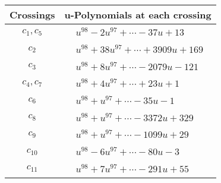 \documentclass[1p]{elsarticle_modified}
\theoremstyle{definition}
\begin{document}
\begin{tabular}{m{50pt}|m{274pt}}
Crossings & \hspace{64pt}u-Polynomials at each crossing \\
\hline $$\begin{aligned}c_{1},c_{5}\end{aligned}$$&$\begin{aligned}
&u^{98}-2 u^{97}+\cdots-37 u+13
\end{aligned}$\\
\hline $$\begin{aligned}c_{2}\end{aligned}$$&$\begin{aligned}
&u^{98}+38 u^{97}+\cdots+3909 u+169
\end{aligned}$\\
\hline $$\begin{aligned}c_{3}\end{aligned}$$&$\begin{aligned}
&u^{98}+8 u^{97}+\cdots-2079 u-121
\end{aligned}$\\
\hline $$\begin{aligned}c_{4},c_{7}\end{aligned}$$&$\begin{aligned}
&u^{98}+4 u^{97}+\cdots+23 u+1
\end{aligned}$\\
\hline $$\begin{aligned}c_{6}\end{aligned}$$&$\begin{aligned}
&u^{98}+u^{97}+\cdots-35 u-1
\end{aligned}$\\
\hline $$\begin{aligned}c_{8}\end{aligned}$$&$\begin{aligned}
&u^{98}+u^{97}+\cdots-3372 u+329
\end{aligned}$\\
\hline $$\begin{aligned}c_{9}\end{aligned}$$&$\begin{aligned}
&u^{98}+u^{97}+\cdots-1099 u+29
\end{aligned}$\\
\hline $$\begin{aligned}c_{10}\end{aligned}$$&$\begin{aligned}
&u^{98}-6 u^{97}+\cdots-80 u-3
\end{aligned}$\\
\hline $$\begin{aligned}c_{11}\end{aligned}$$&$\begin{aligned}
&u^{98}+7 u^{97}+\cdots-291 u+55
\end{aligned}$\\
\hline
\end{tabular}\\~\\
\end{document}

